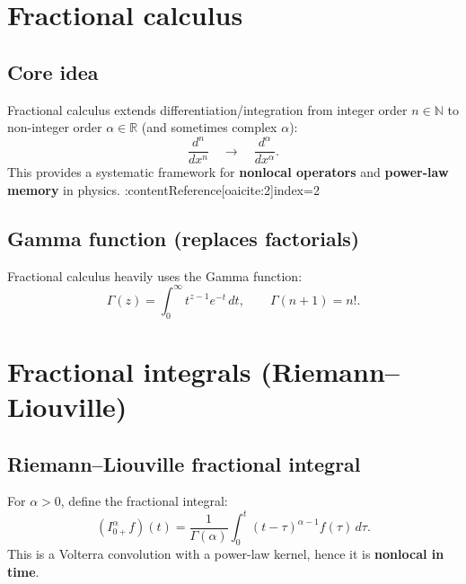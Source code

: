 
\section{Fractional calculus}

\subsection{Core idea}
Fractional calculus extends differentiation/integration from integer order $n\in\mathbb{N}$
to non-integer order $\alpha\in\mathbb{R}$ (and sometimes complex $\alpha$):
\begin{equation}
\frac{d^n}{dx^n} \quad\longrightarrow\quad \frac{d^\alpha}{dx^\alpha}.
\end{equation}
This provides a systematic framework for \textbf{nonlocal operators} and
\textbf{power-law memory} in physics. :contentReference[oaicite:2]{index=2}

\subsection{Gamma function (replaces factorials)}
Fractional calculus heavily uses the Gamma function:
\begin{equation}
\Gamma(z)=\int_0^\infty t^{z-1}e^{-t}\,dt,
\qquad \Gamma(n+1)=n!.
\end{equation}


\section{Fractional integrals (Riemann--Liouville)}

\subsection{Riemann--Liouville fractional integral}
For $\alpha>0$, define the fractional integral:
\begin{equation}
\boxed{
(I_{0+}^\alpha f)(t)
=
\frac{1}{\Gamma(\alpha)}\int_0^t (t-\tau)^{\alpha-1}f(\tau)\,d\tau.
}
\end{equation}
This is a Volterra convolution with a power-law kernel, hence it is \textbf{nonlocal in time}.

